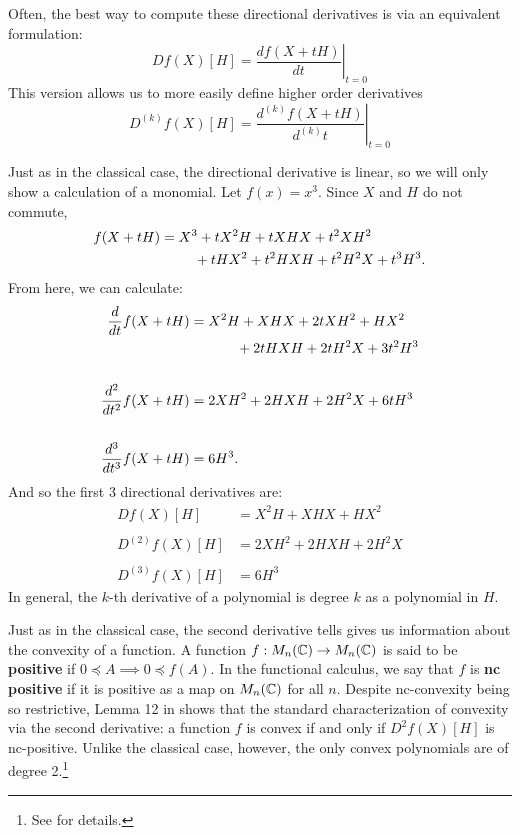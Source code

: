 Often, the best way to compute these directional derivatives is via an
equivalent formulation:
\[
    Df(X)[H] = \left.\frac{df(X+tH)}{dt}\right|_{t=0}
\]
This version allows us to more easily define higher order derivatives
\[
    D^{(k)}f(X)[H] = \left.\frac{d^{(k)}f(X+tH)}{d^{(k)}t}\right|_{t=0}
\]

\begin{example}
  Just as in the classical case, the directional derivative is linear, so we
  will only show a calculation of a monomial. Let \(f(x)=x^3\). Since \(X\) and
  \(H\) do not commute,
  \begin{align*}
    f(X+tH) &= X^3+ tX^2H +tXHX + t^2XH^2\\
    & \hphantom{= X^3}+ tHX^2 + t^2HXH + t^2H^2X +t^3H^3.
  \end{align*}
  From here, we can calculate:
  \begin{align*}
    \frac{d}{dt} f(X+tH) &= X^2H + XHX + 2tXH^2 +HX^2\\
                  &\hphantom{=X^2H} +2tHXH +2tH^2X + 3t^2H^3 \\
     \\
    \frac{d^2}{dt^2} f(X+tH) &= 2XH^2+2HXH +2H^2X + 6tH^3 \\
     \\
    \frac{d^3}{dt^3} f(X+tH) &= 6H^3.
  \end{align*}
  And so the first 3 directional derivatives are:
  \begin{align*}
    Df(X)[H] &= X^2H + XHX +HX^2\\
    \\
    D^{(2)}f(X)[H] &= 2XH^2+2HXH +2H^2X \\
    \\
    D^{(3)}f(X)[H] &= 6H^3
  \end{align*}
  In general, the \(k\)-th derivative of a polynomial is degree \(k\) as a
  polynomial in \(H\).
\end{example}

Just as in the classical case, the second derivative tells gives us information
about the convexity of a function. A function \(f:M_n(\mathbb{C})\to M_n(\mathbb{C})\) is said
to be \textbf{positive} if \(0\preceq A \implies 0\preceq f(A)\). In the
functional calculus, we say that \(f\) is \textbf{nc positive} if it is positive
as a map on \(M_n(\mathbb{C})\) for all \(n\).
Despite nc-convexity being so restrictive, Lemma 12 in \cite{heltonFree2013}
shows that the standard characterization of convexity via the second
derivative: a function \(f\) is convex if and only if \(D^{2}f(X)[H]\) is
nc-positive. Unlike the classical case, however, the only convex polynomials are
of degree 2.\footnote{See \cite{heltonFree2013} for details.}

